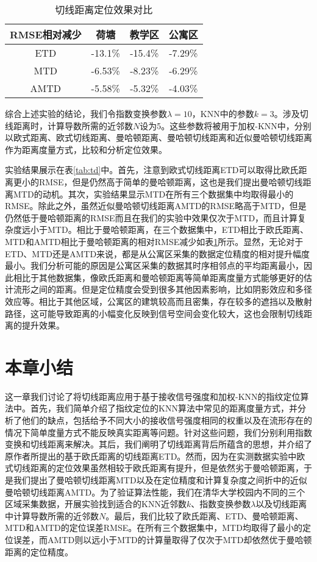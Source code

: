 \begin{table}[tbp]
	\caption{切线距离定位效果对比}
	\begin{center}
		\begin{tabular}{cccc}
			\toprule
			RMSE相对减少 &  荷塘 & 教学区 & 公寓区 \\
			\midrule
			ETD & -13.1\% & -15.4\% & -7.29\% \\
			\midrule
			MTD & -6.53\% & -8.23\% & -6.29\% \\
			\midrule
			AMTD & -5.58\% & -5.32\% & -4.03\% \\
			\bottomrule
		\end{tabular}
		\label{tab:td_relative}
	\end{center}
\end{table}

综合上述实验的结论，我们令指数变换参数$\lambda=10$，KNN中的参数$k=3$。涉及切线距离时，计算导数所需的近邻数$N$设为5。这些参数将被用于加权-KNN中，分别以欧式距离、欧式切线距离、曼哈顿距离、曼哈顿切线距离和近似曼哈顿切线距离作为距离度量方式，比较和分析定位效果。

实验结果展示在表\ref{tab:td}中。首先，注意到欧式切线距离ETD可以取得比欧氏距离更小的RMSE，但是仍然高于简单的曼哈顿距离，这也是我们提出曼哈顿切线距离MTD的动机。其次，实验结果显示MTD在所有三个数据集中均取得最小的RMSE。除此之外，虽然近似曼哈顿切线距离AMTD的RMSE略高于MTD，但是仍然低于曼哈顿距离的RMSE而且在我们的实验中效果仅次于MTD，而且计算复杂度远小于MTD。相比于曼哈顿距离，在三个数据集中，ETD相比于欧氏距离、MTD和AMTD相比于曼哈顿距离的相对RMSE减少如表\ref{tab:td_relative}所示。显然，无论对于ETD、MTD还是AMTD来说，都是从公寓区采集的数据定位精度的相对提升幅度最小。我们分析可能的原因是公寓区采集的数据其时序相邻点的平均距离最小，因此相比于其他数据集，像欧氏距离和曼哈顿距离等简单距离度量方式能够更好的估计流形之间的距离。但是定位精度会受到很多其他因素影响，比如阴影效应和多径效应等。相比于其他区域，公寓区的建筑较高而且密集，存在较多的遮挡以及散射路径，这可能导致距离的小幅变化反映到信号空间会变化较大，这也会限制切线距离的提升效果。

\section{本章小结}

这一章我们讨论了将切线距离应用于基于接收信号强度和加权-KNN的指纹定位算法中。首先，我们简单介绍了指纹定位的KNN算法中常见的距离度量方式，并分析了他们的缺点，包括给予不同大小的接收信号强度相同的权重以及在流形存在的情况下简单度量方式不能反映真实距离等问题。针对这些问题，我们分别利用指数变换和切线距离来解决。其后，我们阐明了切线距离背后所蕴含的思想，并介绍了原作者所提出的基于欧氏距离的切线距离ETD。然而，因为在实测数据实验中欧式切线距离的定位效果虽然相较于欧氏距离有提升，但是依然劣于曼哈顿距离，于是我们提出了曼哈顿切线距离MTD以及在定位精度和计算复杂度之间折中的近似曼哈顿切线距离AMTD。为了验证算法性能，我们在清华大学校园内不同的三个区域采集数据，开展实验找到适合的KNN近邻数$k$、指数变换参数$\lambda$以及切线距离中计算导数所需的近邻数$N$。最后，我们比较了欧氏距离、ETD、曼哈顿距离、MTD和AMTD的定位误差RMSE。在所有三个数据集中，MTD均取得了最小的定位误差，而AMTD则以远小于MTD的计算量取得了仅次于MTD却依然优于曼哈顿距离的定位精度。





